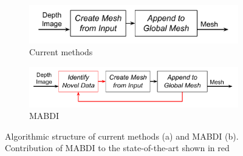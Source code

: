 \begin{figure}[h]%
\centering
\begin{subfigure}[t]{\textwidth}
  \includegraphics[width=.7\textwidth]
    {figures/intro_general_pipeline_blackbox.pdf}
  \caption{Current methods}
  \label{fig:pipeline_cs}
\end{subfigure}
\begin{subfigure}[b]{\textwidth}
  \includegraphics[width=.9\textwidth]
    {figures/intro_general_pipeline_mabdi.pdf}
  \caption{MABDI}
  \label{fig:pipeline_mabdi}
\end{subfigure}
\caption{Algorithmic structure of current methods (a) and MABDI
(b). Contribution of MABDI to the state-of-the-art shown in red}
\label{fig:pipeline}
\end{figure}
